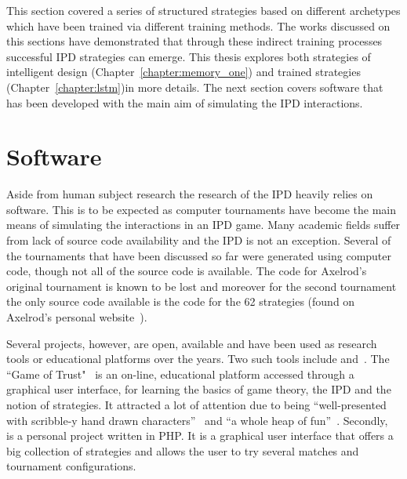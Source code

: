 This section covered a series of structured strategies based on different
archetypes which have been trained via different training methods. The works
discussed on this sections have demonstrated that through these indirect
training processes successful IPD strategies can emerge. This thesis explores
both strategies of intelligent design (Chapter~\ref{chapter:memory_one}) and
trained strategies (Chapter~\ref{chapter:lstm})in more details. The next section
covers software that has been developed with the main aim of simulating the IPD
interactions.

\section{Software}\label{section:software}

Aside from human subject research the research of the IPD heavily relies on software.
This is to be expected as computer tournaments have become the main
means of simulating the interactions in an IPD game.
Many academic fields suffer from lack of source code availability and the IPD
is not an exception. Several of the tournaments that have been discussed so far were generated
using computer code, though not all of the source code is available.
The code for Axelrod's original tournament is known to be lost and
moreover for the second tournament the only source code available is the code
for the 62 strategies (found on Axelrod's personal website~\cite{fortan_code}).

Several projects, however, are open, available and have been used as research
tools or educational platforms over the years. Two such tools include
\cite{pd_trust} and~\cite{trust_blogb}.
The ``Game of Trust"~\cite{pd_trust} is an on-line, educational platform accessed 
through a graphical user interface,
for learning the basics of game theory, the IPD
and the notion of strategies. It attracted a lot of attention
due to being ``well-presented with scribble-y hand drawn
characters''~\cite{trust_blogb} and ``a whole heap of fun''~\cite{trust_bloga}.
Secondly,~\cite{pd_game} is a personal project written in PHP. It is a graphical user
interface that offers a big collection of strategies and allows the user to try
several matches and tournament configurations.

